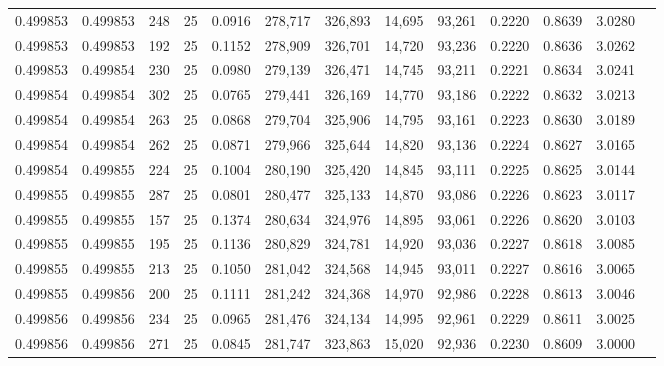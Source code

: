 \begin{tabular}{rrrrrrrrrrrrr}
0.499853 & 0.499853 &   248 &  25 &                                     0.0916 & 278,717 & 326,893 &  14,695 &  93,261 & 0.2220 & 0.8639 & 3.0280 \\
0.499853 & 0.499853 &   192 &  25 &                                     0.1152 & 278,909 & 326,701 &  14,720 &  93,236 & 0.2220 & 0.8636 & 3.0262 \\
0.499853 & 0.499854 &   230 &  25 &                                     0.0980 & 279,139 & 326,471 &  14,745 &  93,211 & 0.2221 & 0.8634 & 3.0241 \\
0.499854 & 0.499854 &   302 &  25 &                                     0.0765 & 279,441 & 326,169 &  14,770 &  93,186 & 0.2222 & 0.8632 & 3.0213 \\
0.499854 & 0.499854 &   263 &  25 &                                     0.0868 & 279,704 & 325,906 &  14,795 &  93,161 & 0.2223 & 0.8630 & 3.0189 \\
0.499854 & 0.499854 &   262 &  25 &                                     0.0871 & 279,966 & 325,644 &  14,820 &  93,136 & 0.2224 & 0.8627 & 3.0165 \\
0.499854 & 0.499855 &   224 &  25 &                                     0.1004 & 280,190 & 325,420 &  14,845 &  93,111 & 0.2225 & 0.8625 & 3.0144 \\
0.499855 & 0.499855 &   287 &  25 &                                     0.0801 & 280,477 & 325,133 &  14,870 &  93,086 & 0.2226 & 0.8623 & 3.0117 \\
0.499855 & 0.499855 &   157 &  25 &                                     0.1374 & 280,634 & 324,976 &  14,895 &  93,061 & 0.2226 & 0.8620 & 3.0103 \\
0.499855 & 0.499855 &   195 &  25 &                                     0.1136 & 280,829 & 324,781 &  14,920 &  93,036 & 0.2227 & 0.8618 & 3.0085 \\
0.499855 & 0.499855 &   213 &  25 &                                     0.1050 & 281,042 & 324,568 &  14,945 &  93,011 & 0.2227 & 0.8616 & 3.0065 \\
0.499855 & 0.499856 &   200 &  25 &                                     0.1111 & 281,242 & 324,368 &  14,970 &  92,986 & 0.2228 & 0.8613 & 3.0046 \\
0.499856 & 0.499856 &   234 &  25 &                                     0.0965 & 281,476 & 324,134 &  14,995 &  92,961 & 0.2229 & 0.8611 & 3.0025 \\
0.499856 & 0.499856 &   271 &  25 &                                     0.0845 & 281,747 & 323,863 &  15,020 &  92,936 & 0.2230 & 0.8609 & 3.0000 \\

\end{tabular}

